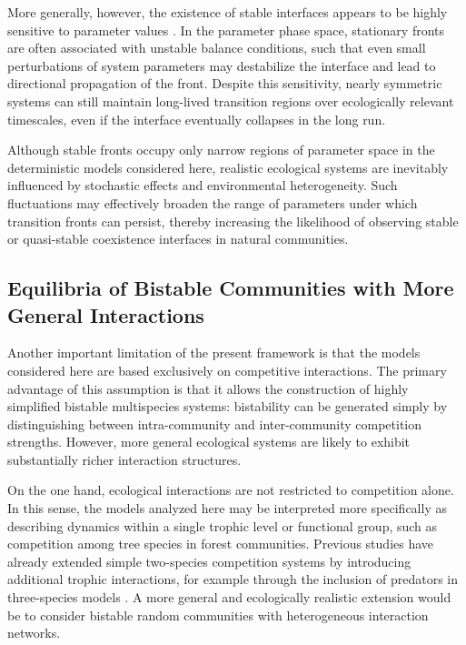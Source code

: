 More generally, however, the existence of stable interfaces appears to be highly sensitive to parameter values \citep{kan-on_parameter_1995}. In the parameter phase space, stationary fronts are often associated with unstable balance conditions, such that even small perturbations of system parameters may destabilize the interface and lead to directional propagation of the front. Despite this sensitivity, nearly symmetric systems can still maintain long-lived transition regions over ecologically relevant timescales, even if the interface eventually collapses in the long run.

Although stable fronts occupy only narrow regions of parameter space in the deterministic models considered here, realistic ecological systems are inevitably influenced by stochastic effects and environmental heterogeneity. Such fluctuations may effectively broaden the range of parameters under which transition fronts can persist, thereby increasing the likelihood of observing stable or quasi-stable coexistence interfaces in natural communities.

\subsection{Equilibria of Bistable Communities with More General Interactions}

Another important limitation of the present framework is that the models considered here are based exclusively on competitive interactions. The primary advantage of this assumption is that it allows the construction of highly simplified bistable multispecies systems: bistability can be generated simply by distinguishing between intra-community and inter-community competition strengths. However, more general ecological systems are likely to exhibit substantially richer interaction structures.

On the one hand, ecological interactions are not restricted to competition alone. In this sense, the models analyzed here may be interpreted more specifically as describing dynamics within a single trophic level or functional group, such as competition among tree species in forest communities. Previous studies have already extended simple two-species competition systems by introducing additional trophic interactions, for example through the inclusion of predators in three-species models \citep{xie_cross-diffusion_2012,lv_turing_2013, parshad_turing_2014}. A more general and ecologically realistic extension would be to consider bistable random communities with heterogeneous interaction networks.

